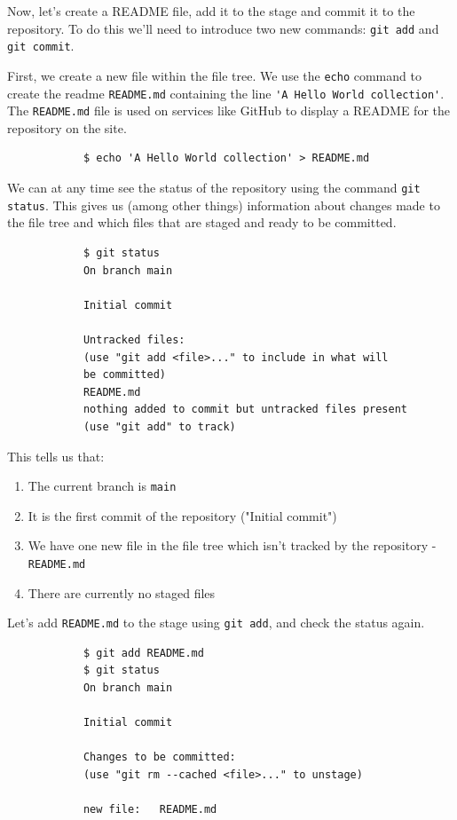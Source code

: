 \documentclass[../main/git_course_main.tex]{subfiles}
\begin{document}
	Now, let's create a README file, add it to the stage and commit it to the repository. To do this we'll need to introduce two new commands:
	\verb$git add$ and \verb$git commit$.
	
	First, we create a new file within the file tree. We use the \verb$echo$ command to create the readme \verb$README.md$ containing the line \verb$'A Hello World collection'$. The \verb$README.md$ file is used on services like GitHub to display a README for the repository on the site.
	
	\begin{codebox}
		\begin{lstlisting}
			$ echo 'A Hello World collection' > README.md
		\end{lstlisting}
	\end{codebox}
	
	We can at any time see the status of the repository using the command \verb$git status$.
	This gives us (among other things) information about changes made to the file tree and which files that are staged and ready to be committed.
	
	\begin{codebox}
		\begin{lstlisting}
			$ git status
			On branch main
			
			Initial commit
			
			Untracked files:
			(use "git add <file>..." to include in what will 
			be committed)
			README.md
			nothing added to commit but untracked files present 
			(use "git add" to track)
		\end{lstlisting}
	\end{codebox}
	
	This tells us that:
	
	\begin{enumerate}
		\item The current branch is \verb$main$
		\item It is the first commit of the repository ("Initial commit")
		\item We have one new file in the file tree which isn't tracked by the repository - \verb$README.md$
		\item There are currently no staged files
	\end{enumerate}
	
	Let's add \verb$README.md$ to the stage using \verb$git add$, and check the status again.
	
	\begin{codebox}
		\begin{lstlisting}
			$ git add README.md
			$ git status
			On branch main
			
			Initial commit
			
			Changes to be committed:
			(use "git rm --cached <file>..." to unstage)
			
			new file:   README.md
		\end{lstlisting}
	\end{codebox}
	
\end{document}
